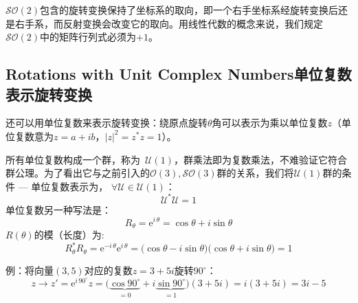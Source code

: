 $\mathcal{SO}(2)$包含的旋转变换保持了坐标系的取向，即一个右手坐标系经旋转变换后还是右手系，而反射变换会改变它的取向。用线性代数的概念来说，我们规定$\mathcal{SO}(2)$中的矩阵行列式必须为$+1$。

\subsection[单位复数表示旋转变换]{Rotations with Unit Complex Numbers\quad 单位复数表示旋转变换}
\label{sec3.2.1}
还可以用单位复数来表示旋转变换：绕原点旋转$\theta$角可以表示为乘以单位复数$z$（单位复数意为$z = a + ib$，$|z|^2 = z^* z = 1$）。

所有单位复数构成一个群，称为\ $\mathcal{U}(1)$，群乘法即为复数乘法，不难验证它符合群公理。为了看出它与之前引入的$\mathcal{O}(3), \mathcal{SO}(3)$群的关系，我们将$\mathcal{U}(1)$群的条件 --- 单位复数表示为， $\forall \mathcal{U} \in \mathcal{U}(1)$：
\begin{equation}
\label{equ3.11}
\mathcal{U}^* \mathcal{U} = 1
\end{equation}
单位复数另一种写法是：%
\begin{equation}
\label{equ3.12}
R_\theta = \mathrm{e}^{i\,\theta} = \cos \theta + i\sin \theta
\end{equation}
$R(\theta)$的模（长度）为:
\begin{equation}
\label{equ3.13}
R_\theta^* R_\theta = \mathrm{e}^{-i\,\theta} \mathrm{e}^{i\,\theta} = \big( \cos \theta - i \sin \theta  \big) \big( \cos \theta + i \sin \theta \big) = 1
\end{equation}


例：将向量$(3,  5)$对应的复数$z = 3 + 5i$旋转$90^\circ$：
\begin{equation}
\label{equ3.14}
z \rightarrow z' = \mathrm{e}^{i\, 90^\circ}z = \bigg( \underbrace{\cos 90^\circ}_{=0} + i\underbrace{\sin 90^\circ}_{=1} \bigg) (3 + 5i) = i(3 + 5i) = 3i - 5
\end{equation}

